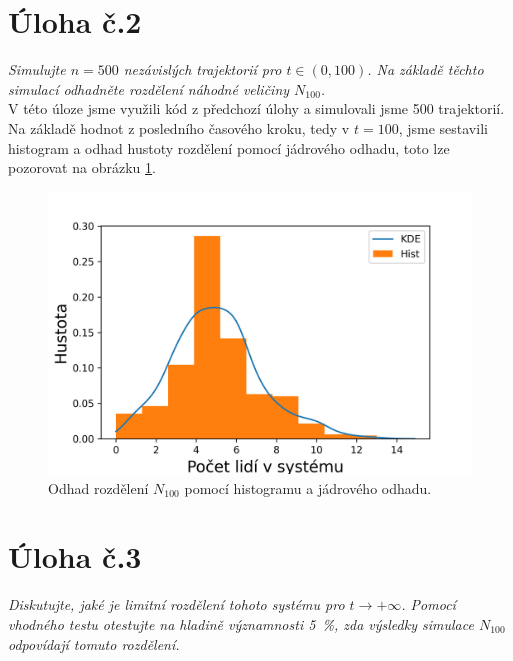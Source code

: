 \documentclass[czech]{mvi-report}
\begin{document}
\section{Úloha č.2}
\textit{Simulujte $n = 500$ nezávislých trajektorií pro $t\in(0,100)$. Na základě těchto simulací odhadněte rozdělení náhodné veličiny $N_{100}$.}\\

V této úloze jsme využili kód z předchozí úlohy a simulovali jsme 500 trajektorií. Na základě hodnot z posledního časového kroku, tedy v $ t=100 $, jsme sestavili histogram a  odhad hustoty rozdělení pomocí jádrového odhadu, toto lze pozorovat na obrázku \ref{fig:histkde}.

\begin{figure}
\includegraphics[width=\columnwidth]{img/histkde.png} 
\caption{ Odhad rozdělení $ N_{100} $ pomocí histogramu a jádrového odhadu.}
\label{fig:histkde} 
\end{figure}

\section{Úloha č.3}
\textit{Diskutujte, jaké je limitní rozdělení tohoto systému pro $t\to+\infty$. Pomocí vhodného testu otestujte na hladině významnosti 5~\%, zda výsledky simulace $N_{100}$ odpovídají tomuto rozdělení.}\\
\end{document}
